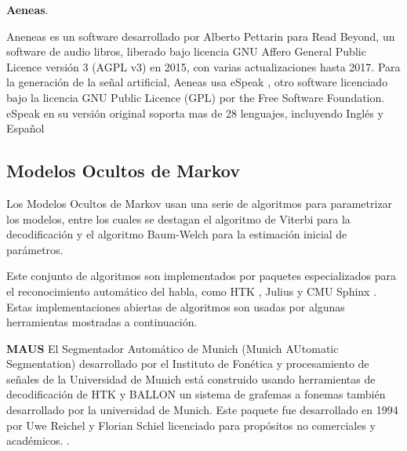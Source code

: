 \textbf{Aeneas}.

Aneneas \cite{aeneas} es un software desarrollado por Alberto Pettarin para Read Beyond, un software de audio libros, liberado bajo licencia GNU Affero General Public Licence versión 3 (AGPL v3) en 2015, con varias actualizaciones hasta 2017. Para la generación de la señal artificial, Aeneas usa eSpeak \cite{espeak}, otro software licenciado bajo la licencia GNU Public Licence (GPL) por the Free Software Foundation. eSpeak en su versión original soporta mas de 28 lenguajes, incluyendo Inglés y Español

\subsection{Modelos Ocultos de Markov}

Los Modelos Ocultos de Markov usan una serie de algoritmos para parametrizar los modelos, entre los cuales se destagan el algoritmo de Viterbi para la decodificación \cite{Forney1973TheAlgorithm} y el algoritmo Baum-Welch para la estimación inicial de parámetros.

Este conjunto de algoritmos son implementados por paquetes especializados para el reconocimiento automático del habla, como  HTK \cite{Young1994ThePhilosophy}, Julius \cite{LeeEurospeechEngine} y CMU Sphinx \cite{Lee1990AnSystem}. Estas implementaciones abiertas de algoritmos son usadas por algunas herramientas mostradas a continuación.

\textbf{MAUS}
El Segmentador Automático de Munich (Munich AUtomatic Segmentation) desarrollado por el Instituto de Fonética y procesamiento de señales de la Universidad de Munich está construido usando herramientas de decodificación de HTK y BALLON un sistema de grafemas a fonemas también desarrollado por la  universidad de Munich. Este paquete fue desarrollado en 1994 por Uwe Reichel y Florian Schiel licenciado para propósitos no comerciales y académicos. \cite{WesenickAPPLYINGPRONUNCIATION}. 

